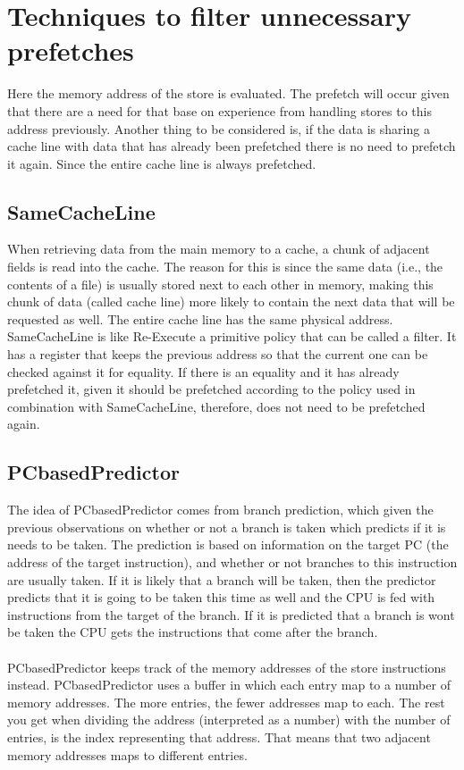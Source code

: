 \section{Techniques to filter unnecessary prefetches}
 Here the memory address of the store is evaluated. The prefetch will occur given that there are a need for that base on experience from handling stores to this address previously. Another
thing to be considered is, if the data is sharing a cache line with data that has already
been prefetched there is no need to prefetch it again. Since the entire cache line is
always prefetched.
 \subsection{SameCacheLine}
When retrieving data from the main memory to a cache, a chunk of adjacent fields is
read into the cache. The reason for this is since the same data (i.e., the contents of a
file) is usually stored next to each other in memory, making this chunk of data (called
cache line) more likely to contain the next data that will be requested as well. The
entire cache line has the same physical address. SameCacheLine is like Re-Execute a
primitive policy that can be called a filter. It has a register that keeps the previous
address so that the current one can be checked against it for equality. If there is an
equality and it has already prefetched it, given it should be prefetched according to
the policy used in combination with SameCacheLine, therefore, does not need to be
prefetched again. 
\subsection{PCbasedPredictor}
The idea of PCbasedPredictor comes from branch prediction, which given the previous observations on whether or not a branch is taken which predicts if it is needs to
be taken. The prediction is based on information on the target PC (the address of
the target instruction), and whether or not branches to this instruction are usually
taken. If it is likely that a branch will be taken, then the predictor predicts that it
is going to be taken this time as well and the CPU is fed with instructions from the
target of the branch. If it is predicted that a branch is wont be taken the CPU gets the instructions that come after the branch. \\ \\
PCbasedPredictor keeps track of the memory addresses of the store instructions instead. PCbasedPredictor uses a buffer in which each entry map to a number of memory addresses. The more entries, the fewer addresses map to each. The rest you get when dividing the address
(interpreted as a number) with the number of entries, is the index representing that
address. That means that two adjacent memory addresses maps to different entries.\\ \\


